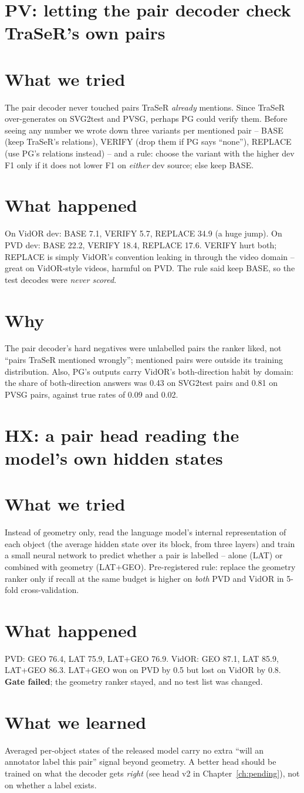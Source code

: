 \documentclass[11pt,openany]{book}
\newcommand{\tsec}{\section*{What we tried}}
\newcommand{\wsec}{\section*{Why}}
\newcommand{\hsec}{\section*{What happened}}
\newcommand{\lsec}{\section*{What we learned}}
\begin{document}
\section{PV: letting the pair decoder check TraSeR's own pairs}
\tsec
The pair decoder never touched pairs TraSeR \emph{already} mentions. Since TraSeR over-generates on SVG2test and PVSG, perhaps PG
could verify them. Before seeing any number we wrote down three variants per mentioned pair -- BASE (keep TraSeR's relations),
VERIFY (drop them if PG says ``none''), REPLACE (use PG's relations instead) -- and a rule: choose the variant with the higher dev F1
only if it does not lower F1 on \emph{either} dev source; else keep BASE.

\hsec
On VidOR dev: BASE 7.1, VERIFY 5.7, REPLACE 34.9 (a huge jump). On PVD dev: BASE 22.2, VERIFY 18.4, REPLACE 17.6. VERIFY hurt both;
REPLACE is simply VidOR's convention leaking in through the video domain -- great on VidOR-style videos, harmful on PVD. The rule
said keep BASE, so the test decodes were \emph{never scored}.

\wsec
The pair decoder's hard negatives were unlabelled pairs the ranker liked, not ``pairs TraSeR mentioned wrongly''; mentioned pairs
were outside its training distribution. Also, PG's outputs carry VidOR's both-direction habit by domain: the share of both-direction
answers was 0.43 on SVG2test pairs and 0.81 on PVSG pairs, against true rates of 0.09 and 0.02.

\section{HX: a pair head reading the model's own hidden states}
\tsec
Instead of geometry only, read the language model's internal representation of each object (the average hidden state over its
block, from three layers) and train a small neural network to predict whether a pair is labelled -- alone (LAT) or combined with
geometry (LAT+GEO). Pre-registered rule: replace the geometry ranker only if recall at the same budget is higher on \emph{both} PVD
and VidOR in 5-fold cross-validation.

\hsec
PVD: GEO 76.4, LAT 75.9, LAT+GEO 76.9. VidOR: GEO 87.1, LAT 85.9, LAT+GEO 86.3. LAT+GEO won on PVD by 0.5 but lost on VidOR by 0.8.
\textbf{Gate failed}; the geometry ranker stayed, and no test list was changed.

\lsec
Averaged per-object states of the released model carry no extra ``will an annotator label this pair'' signal beyond geometry. A
better head should be trained on what the decoder gets \emph{right} (see head v2 in Chapter~\ref{ch:pending}), not on whether a label
exists.
\end{document}
